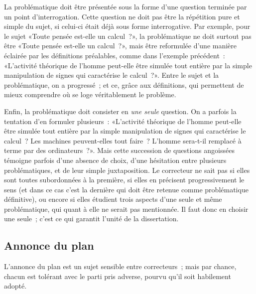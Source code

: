 \documentclass[a4paper,11pt]{article}
\begin{document}
\par

La problématique doit être présentée sous la forme d'une question
terminée par un point d'interrogation.  Cette question ne doit pas être
la répétition pure et simple du sujet, si celui-ci était déjà sous forme
interrogative. Par exemple, pour le sujet «Toute pensée est-elle un
calcul~?», la problématique ne doit surtout pas être «Toute pensée
est-elle un calcul~?», mais être reformulée d'une manière éclairée par
les définitions préalables, comme dans l'exemple précédent~: «L'activité
théorique de l'homme peut-elle être simulée tout entière par la simple
manipulation de signes qui caractérise le calcul~?». Entre le sujet et
la problématique, on a progressé~; et ce, grâce aux définitions, qui
permettent de mieux comprendre où se loge véritablement le problème.

\par

Enfin, la problématique doit consister en \emph{une seule} question. On
a parfois la tentation d'en formuler plusieurs~: «L'activité théorique
de l'homme peut-elle être simulée tout entière par la simple
manipulation de signes qui caractérise le calcul~? Les machines
peuvent-elles tout faire~? L'homme sera-t-il remplacé à terme par des
ordinateurs~?». Mais cette succession de questions angoissées témoigne
parfois d'une absence de choix, d'une hésitation entre plusieurs
problématiques, et de leur simple juxtaposition. Le correcteur ne sait
pas si elles sont toutes subordonnées à la première, si elles en
précisent progressivement le sens (et dans ce cas c'est la dernière qui
doit être retenue comme problématique définitive), ou encore si elles
étudient trois aspects d'une seule et même problématique, qui quant à
elle ne serait pas mentionnée. Il faut donc en choisir une seule~; c'est
ce qui garantit l'unité de la dissertation.

\par








\subsection{Annonce du plan}

L'annonce du plan est un sujet sensible entre correcteurs~; mais par
chance, chacun est tolérant avec le parti pris adverse, pourvu qu'il
soit habilement adopté. 
\end{document}
